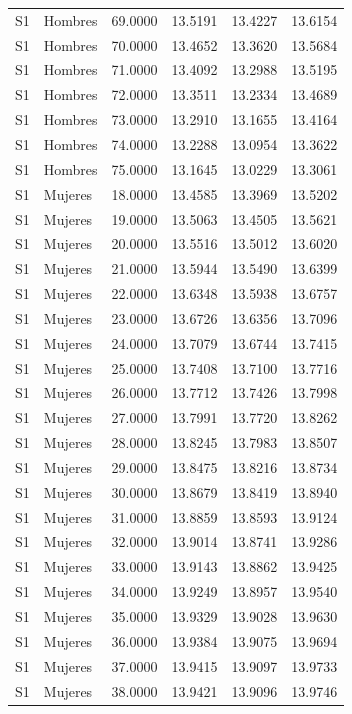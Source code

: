\begin{longtable}{llrrrr}
S1 & Hombres & 69.0000 & 13.5191 & 13.4227 & 13.6154 \\
S1 & Hombres & 70.0000 & 13.4652 & 13.3620 & 13.5684 \\
S1 & Hombres & 71.0000 & 13.4092 & 13.2988 & 13.5195 \\
S1 & Hombres & 72.0000 & 13.3511 & 13.2334 & 13.4689 \\
S1 & Hombres & 73.0000 & 13.2910 & 13.1655 & 13.4164 \\
S1 & Hombres & 74.0000 & 13.2288 & 13.0954 & 13.3622 \\
S1 & Hombres & 75.0000 & 13.1645 & 13.0229 & 13.3061 \\
S1 & Mujeres & 18.0000 & 13.4585 & 13.3969 & 13.5202 \\
S1 & Mujeres & 19.0000 & 13.5063 & 13.4505 & 13.5621 \\
S1 & Mujeres & 20.0000 & 13.5516 & 13.5012 & 13.6020 \\
S1 & Mujeres & 21.0000 & 13.5944 & 13.5490 & 13.6399 \\
S1 & Mujeres & 22.0000 & 13.6348 & 13.5938 & 13.6757 \\
S1 & Mujeres & 23.0000 & 13.6726 & 13.6356 & 13.7096 \\
S1 & Mujeres & 24.0000 & 13.7079 & 13.6744 & 13.7415 \\
S1 & Mujeres & 25.0000 & 13.7408 & 13.7100 & 13.7716 \\
S1 & Mujeres & 26.0000 & 13.7712 & 13.7426 & 13.7998 \\
S1 & Mujeres & 27.0000 & 13.7991 & 13.7720 & 13.8262 \\
S1 & Mujeres & 28.0000 & 13.8245 & 13.7983 & 13.8507 \\
S1 & Mujeres & 29.0000 & 13.8475 & 13.8216 & 13.8734 \\
S1 & Mujeres & 30.0000 & 13.8679 & 13.8419 & 13.8940 \\
S1 & Mujeres & 31.0000 & 13.8859 & 13.8593 & 13.9124 \\
S1 & Mujeres & 32.0000 & 13.9014 & 13.8741 & 13.9286 \\
S1 & Mujeres & 33.0000 & 13.9143 & 13.8862 & 13.9425 \\
S1 & Mujeres & 34.0000 & 13.9249 & 13.8957 & 13.9540 \\
S1 & Mujeres & 35.0000 & 13.9329 & 13.9028 & 13.9630 \\
S1 & Mujeres & 36.0000 & 13.9384 & 13.9075 & 13.9694 \\
S1 & Mujeres & 37.0000 & 13.9415 & 13.9097 & 13.9733 \\
S1 & Mujeres & 38.0000 & 13.9421 & 13.9096 & 13.9746 \\

\end{longtable}

